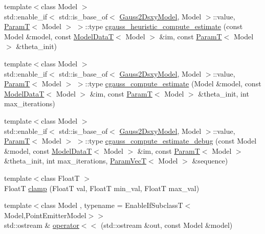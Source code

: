 \begin{DoxyCompactItemize}
\item 
{\footnotesize template$<$class Model $>$ }\\std\+::enable\+\_\+if$<$ std\+::is\+\_\+base\+\_\+of$<$ \hyperlink{classmappel_1_1Gauss2DsxyModel}{Gauss2\+Dsxy\+Model}, Model $>$\+::value, \hyperlink{namespacemappel_a667925cb0d6c0e49f2f035cc5a9a6857}{ParamT}$<$ Model $>$ $>$\+::type \hyperlink{namespacemappel_a9da41ac3fd825332b3f38efbb72f6610}{cgauss\+\_\+heuristic\+\_\+compute\+\_\+estimate} (const Model \&model, const \hyperlink{namespacemappel_a97f050df953605381ae9c901c3b125f1}{Model\+DataT}$<$ Model $>$ \&im, const \hyperlink{namespacemappel_a667925cb0d6c0e49f2f035cc5a9a6857}{ParamT}$<$ Model $>$ \&theta\+\_\+init)
\item 
{\footnotesize template$<$class Model $>$ }\\std\+::enable\+\_\+if$<$ std\+::is\+\_\+base\+\_\+of$<$ \hyperlink{classmappel_1_1Gauss2DsxyModel}{Gauss2\+Dsxy\+Model}, Model $>$\+::value, \hyperlink{namespacemappel_a667925cb0d6c0e49f2f035cc5a9a6857}{ParamT}$<$ Model $>$ $>$\+::type \hyperlink{namespacemappel_a0b7f83ad91e017a15ec1bd3daac10696}{cgauss\+\_\+compute\+\_\+estimate} (Model \&model, const \hyperlink{namespacemappel_a97f050df953605381ae9c901c3b125f1}{Model\+DataT}$<$ Model $>$ \&im, const \hyperlink{namespacemappel_a667925cb0d6c0e49f2f035cc5a9a6857}{ParamT}$<$ Model $>$ \&theta\+\_\+init, int max\+\_\+iterations)
\item 
{\footnotesize template$<$class Model $>$ }\\std\+::enable\+\_\+if$<$ std\+::is\+\_\+base\+\_\+of$<$ \hyperlink{classmappel_1_1Gauss2DsxyModel}{Gauss2\+Dsxy\+Model}, Model $>$\+::value, \hyperlink{namespacemappel_a667925cb0d6c0e49f2f035cc5a9a6857}{ParamT}$<$ Model $>$ $>$\+::type \hyperlink{namespacemappel_ae11a3f8db8843240c8fc2d823479cc23}{cgauss\+\_\+compute\+\_\+estimate\+\_\+debug} (const Model \&model, const \hyperlink{namespacemappel_a97f050df953605381ae9c901c3b125f1}{Model\+DataT}$<$ Model $>$ \&im, const \hyperlink{namespacemappel_a667925cb0d6c0e49f2f035cc5a9a6857}{ParamT}$<$ Model $>$ \&theta\+\_\+init, int max\+\_\+iterations, \hyperlink{namespacemappel_a0f86d3153e4e27b095012f140eea58de}{Param\+VecT}$<$ Model $>$ \&sequence)
\item 
{\footnotesize template$<$class FloatT $>$ }\\FloatT \hyperlink{namespacemappel_a32bfb3832cd151b3b17601f6a8449ed6}{clamp} (FloatT val, FloatT min\+\_\+val, FloatT max\+\_\+val)
\item 
{\footnotesize template$<$class Model , typename  = Enable\+If\+Subclass\+T$<$\+Model,\+Point\+Emitter\+Model$>$$>$ }\\std\+::ostream \& \hyperlink{namespacemappel_a6e0c0a729adcdd75dcf8f7f504884fbb}{operator$<$$<$} (std\+::ostream \&out, const Model \&model)

\end{DoxyCompactItemize}
